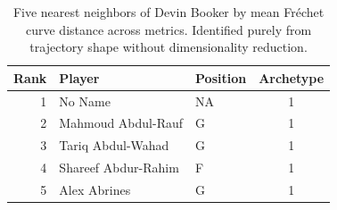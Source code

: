 \begin{table}[htbp]
  \centering\small
  \begin{tabular}{rllc}
    \toprule
    Rank & Player & Position & Archetype \\
    \midrule
    1 & No Name & NA & 1 \\
    2 & Mahmoud Abdul-Rauf & G & 1 \\
    3 & Tariq Abdul-Wahad & G & 1 \\
    4 & Shareef Abdur-Rahim & F & 1 \\
    5 & Alex Abrines & G & 1 \\
    \bottomrule
  \end{tabular}
  \caption{Five nearest neighbors of Devin Booker by mean Fr\'{e}chet curve distance across metrics. Identified purely from trajectory shape without dimensionality reduction.}
\end{table}


